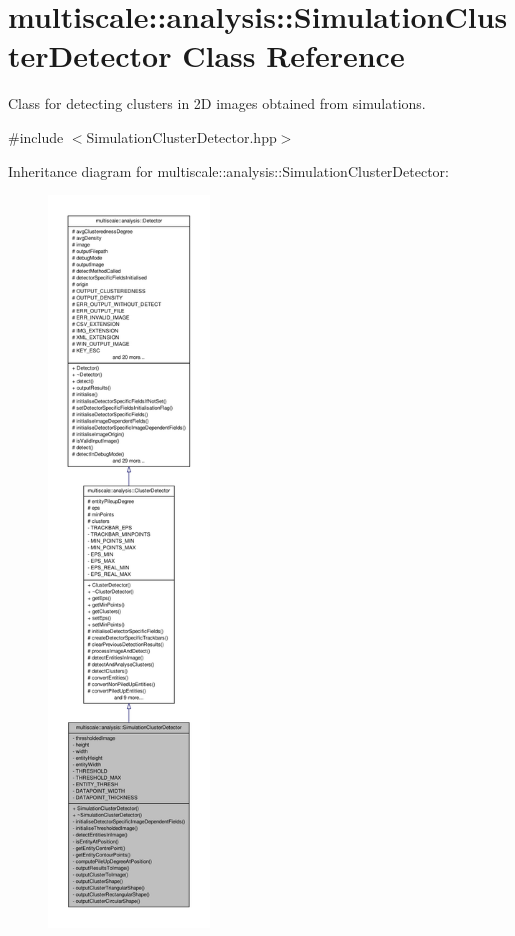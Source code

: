 \hypertarget{classmultiscale_1_1analysis_1_1SimulationClusterDetector}{\section{multiscale\-:\-:analysis\-:\-:\-Simulation\-Cluster\-Detector \-Class \-Reference}
\label{classmultiscale_1_1analysis_1_1SimulationClusterDetector}
}


\-Class for detecting clusters in 2\-D images obtained from simulations.  




{\ttfamily \#include $<$\-Simulation\-Cluster\-Detector.\-hpp$>$}



\-Inheritance diagram for multiscale\-:\-:analysis\-:\-:\-Simulation\-Cluster\-Detector\-:\nopagebreak
\begin{figure}[H]
\begin{center}
\leavevmode
\includegraphics[height=550pt]{classmultiscale_1_1analysis_1_1SimulationClusterDetector__inherit__graph}
\end{center}
\end{figure}


